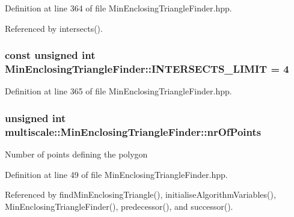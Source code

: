 \-Definition at line 364 of file \-Min\-Enclosing\-Triangle\-Finder.\-hpp.



\-Referenced by intersects().

\hypertarget{classmultiscale_1_1MinEnclosingTriangleFinder_a2d3db503338bc7b70a2e7122eb5b13e3}{
\subsubsection[{\-I\-N\-T\-E\-R\-S\-E\-C\-T\-S\-\_\-\-L\-I\-M\-I\-T}]{\setlength{\rightskip}{0pt plus 5cm}const unsigned int {\bf \-Min\-Enclosing\-Triangle\-Finder\-::\-I\-N\-T\-E\-R\-S\-E\-C\-T\-S\-\_\-\-L\-I\-M\-I\-T} = 4}}\label{classmultiscale_1_1MinEnclosingTriangleFinder_a2d3db503338bc7b70a2e7122eb5b13e3}


\-Definition at line 365 of file \-Min\-Enclosing\-Triangle\-Finder.\-hpp.

\hypertarget{classmultiscale_1_1MinEnclosingTriangleFinder_a92409868a6731f5e41878085f3ac0f73}{
\subsubsection[{nr\-Of\-Points}]{\setlength{\rightskip}{0pt plus 5cm}unsigned int {\bf multiscale\-::\-Min\-Enclosing\-Triangle\-Finder\-::nr\-Of\-Points}}}\label{classmultiscale_1_1MinEnclosingTriangleFinder_a92409868a6731f5e41878085f3ac0f73}
\-Number of points defining the polygon 

\-Definition at line 49 of file \-Min\-Enclosing\-Triangle\-Finder.\-hpp.



\-Referenced by find\-Min\-Enclosing\-Triangle(), initialise\-Algorithm\-Variables(), \-Min\-Enclosing\-Triangle\-Finder(), predecessor(), and successor().

